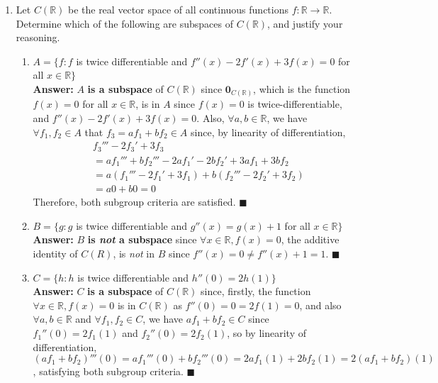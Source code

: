 \documentclass[11pt,twoside]{article}
\newcommand{\R}{\mathbb{R}}
\newcounter{a}
\begin{document}
\begin{enumerate}
    \item Let $C(\R)$ be the real vector space of all continuous functions $f:\R\rightarrow\R$. Determine which of the following are subspaces of $C(\R)$, and justify your reasoning.
          \begin{enumerate}
              \item $A=\{f:f$ is twice differentiable and $f''(x)-2f'(x)+3f(x)=0$ for all $x\in\R\}$\\
                    \textbf{Answer:} $A$ \textbf{is a subspace} of $C(\R)$ since $\mathbf{0}_{C(\R)}$, which is the function $f(x)=0$ for all $x\in \R$, is in $A$ since $f(x)=0$ is twice-differentiable, and $f''(x)-2f'(x)+3f(x)=0$. Also, $\forall a,b\in\R$, we have $\forall f_1,f_2\in A$ that $f_3=af_1 + bf_2\in A$ since, by linearity of differentiation,
                    \begin{align*}
                         & f_3'''-2f_3'+3f_3                          \\
                         & =af_1'''+bf_2'''-2af_1'-2bf_2'+3af_1+3bf_2 \\
                         & =a(f_1'''-2f_1'+3f_1)+b(f_2'''-2f_2'+3f_2) \\
                         & =a0+b0=\boxed{0}
                    \end{align*}
                    Therefore, both subgroup criteria are satisfied. $\blacksquare$
              \item $B=\{g:g$ is twice differentiable and $g''(x)=g(x)+1 $ for all $x\in\R\}$\\
                    \textbf{Answer:} $B$ \textbf{is \textit{not} a subspace} since $\forall x\in\R, f(x)=0$, the additive identity of $C(R)$, is \textit{not} in $B$ since $f''(x)=0\ne f''(x)+1=1$. $\blacksquare$
              \item $C=\{h:h$ is twice differentiable and $h''(0)=2h(1)\}$\\
                    \textbf{Answer:} $C$ \textbf{is a subspace} of $C(\R)$ since, firstly, the function $\forall x\in\R, f(x)=0$ is in $C(\R)$ as $f''(0)=0=2f(1)=0$, and also $\forall a,b\in\R$ and $\forall f_1,f_2\in C$, we have $af_1+bf_2\in C$ since $f_1''(0)=2f_1(1)$ and $f_2''(0)=2f_2(1)$, so by linearity of differentiation, $(af_1+bf_2)'''(0)=af_1'''(0)+bf_2'''(0)=2af_1(1)+2bf_2(1)=2(af_1+bf_2)(1)$, satisfying both subgroup criteria. $\blacksquare$

          \end{enumerate}

\end{enumerate}
\end{document}
